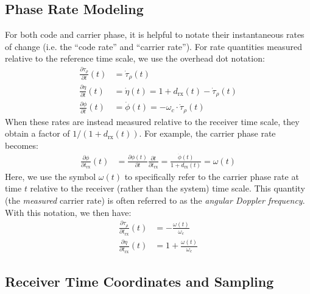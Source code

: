 \documentclass{article}
\begin{document}
\subsection{Phase Rate Modeling}
For both code and carrier phase, it is helpful to notate their instantaneous rates of change (i.e. the ``code rate'' and ``carrier rate'').  For rate quantities  measured relative to the reference time scale, we use the overhead dot notation:
%
\begin{align}
    \frac{\partial \tau_\rho}{\partial t}(t) &= \dot{\tau}_\rho(t)  \\
    \frac{\partial \eta}{\partial t}(t) &= \dot{\eta}(t) = 1 + d_\text{rx}(t) - \dot{\tau}_\rho(t)  \\
    \frac{\partial \phi}{\partial t}(t) &= \dot{\phi}(t) = -\omega_c \cdot \dot{\tau}_\rho(t) 
\end{align}
%
When these rates are instead measured relative to the receiver time scale, they obtain a factor of $1/(1+d_\text{rx}(t))$.  For example, the carrier phase rate becomes:
%
%
\begin{align}
    \frac{\partial \phi}{\partial t_\text{rx}}(t) &= \frac{\partial \phi(t)}{\partial t} \frac{\partial t}{\partial t_\text{rx}} = \frac{\dot{\phi}(t)}{1 + d_\text{rx}(t)} = \omega(t)
\end{align}
%
Here, we use the symbol $\omega(t)$ to specifically refer to the carrier phase rate at time $t$ relative to the receiver (rather than the system) time scale.  This quantity (the \textit{measured} carrier rate) is often referred to as the \textit{angular Doppler frequency}.  With this notation, we then have:
%
\begin{align}
    \frac{\partial \tau_\rho}{\partial t_\text{rx}}(t) &= -\frac{\omega(t)}{\omega_c}  \\
    \frac{\partial \eta}{\partial t_\text{rx}}(t) &= 1 + \frac{\omega(t)}{\omega_c}  \label{eqn:angular-dopp-to-code-rate}
\end{align}
%



\subsection{Receiver Time Coordinates and Sampling}
\end{document}
